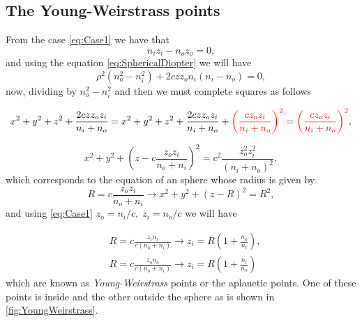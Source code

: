         \subsection{The Young-Weirstrass points}

            From the case \ref{eq:Case1} we have that
            \begin{equation*}
                n_iz_i - n_oz_o=0,
            \end{equation*}
            and using the equation \ref{eq:SphericalDiopter} we will have
            \begin{equation}
                \rho^2\left( n_o^2-n_i^2\right) + 2czz_on_i(n_i-n_o) = 0,
            \end{equation}
            now, dividing by $n_o^2-n_i^2$ and then we must complete squares as follows

            \begin{equation*}
                x^2+y^2 + z^2 + \frac{2czz_oz_i}{n_i+n_o} = x^2 + y^2 + z^2 + \frac{2czz_oz_i}{n_i+n_o} + \text{\color{red} $\left( \frac{cz_oz_i}{n_i+n_o} \right)^2$}
                = \text{\color{red} $\left( \frac{cz_oz_i}{n_i+n_o} \right)^2$},
            \end{equation*}

            \begin{equation}\label{eq:SphericalDiopter1}
                x^2 + y^2 + \left(z - c\frac{z_oz_i}{n_o+n_i}\right)^2 = c^2 \frac{z_o^2z_i^2}{(n_i+n_o)^2},
            \end{equation}
            which corresponds to the equation of an sphere whose radius is given by
            \begin{equation}
                R = c \frac{z_oz_i}{n_o+n_i} \longrightarrow x^2 + y^2 + \left(z-R\right)^2 = R^2,
            \end{equation}
            and using \ref{eq:Case1} $z_o=n_i/c,\;z_i=n_o/c$ we will have

            \begin{align}
                & R = c \frac{z_in_i}{c(n_o+n_i)} \longrightarrow z_i = R\left(1 + \frac{n_o}{n_i}\right),\\
                & R = c \frac{z_on_o}{c(n_o+n_i)} \longrightarrow z_i = R\left(1 + \frac{n_i}{n_o}\right)
            \end{align}
            which are known as \emph{Young-Weirstrass} points or the aplanetic points. One of these points is inside and the other outside the sphere as is shown in \ref{fig:YoungWeirstrass}.

